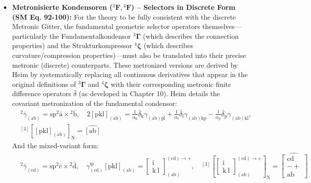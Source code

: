 \documentclass[12pt]{article}
\newcommand{\fundamentalkondensor}{{}^3\bm{\Gamma}}
\newcommand{\strukturkompressor}{{}^4\bm{\zeta}}
\newcommand{\metronisiertekondensor}[1]{{}^{#1}\mathbf{F}} %
\begin{document}
\begin{itemize}
    \item \textbf{Metronisierte Kondensoren (\( \metronisiertekondensor{3}, \metronisiertekondensor{4} \)) – Selectors in Discrete Form (SM Eq. 92-100):}
    For the theory to be fully consistent with the discrete Metronic Gitter, the fundamental geometric selector operators themselves—particularly the Fundamentalkondensor \( \fundamentalkondensor \) (which describes the connection properties) and the Strukturkompressor \( \strukturkompressor \) (which describes curvature/compression properties)—must also be translated into their precise metronic (discrete) counterparts. These metronized versions are derived by Heim by systematically replacing all continuous derivatives that appear in the original definitions of \( \fundamentalkondensor \) and \( \strukturkompressor \) with their corresponding metronic finite difference operators \( \bar{\delta} \) (as developed in Chapter 10). 
    Heim details the covariant metronization of the fundamental condensor:
    \begin{equation}
    \begin{aligned}
    & {}^2\bar{\gamma}_{(\mathrm{ab})} = \mathrm{sp}{}^2\bar{\mathrm{a}} \times {}^2\bar{\mathrm{b}}, \quad 2\left[\mathrm{pkl}\right]_{(\mathrm{ab})} = \frac{1}{\alpha_\mathrm{k}} \bar{\delta}_\mathrm{k} \gamma_{(\mathrm{ab})\mathrm{pl}} + \frac{1}{\alpha_\mathrm{l}} \bar{\delta}_\mathrm{l} \gamma_{(\mathrm{ab})\mathrm{kp}} - \frac{1}{\alpha_\mathrm{p}} \bar{\delta}_\mathrm{p} \gamma_{(\mathrm{ab})\mathrm{kl}}, \\
    & {}^{[3]}\left[ \left[ \mathrm{pkl} \right]_{(\mathrm{ab})} \right]_\mathrm{N} = \widehat{[\mathrm{ab}]}
    \end{aligned} \tag{92}
    \end{equation}
    And the mixed-variant form:
    \begin{equation}
    \begin{aligned}
    & {}^2\bar{\gamma}_{(\mathrm{cd})} = \mathrm{sp}{}^2\bar{\mathrm{c}} \times {}^2\bar{\mathrm{d}}, \quad \gamma^{\mathrm{ip}}_{(\mathrm{cd})} \left[ \mathrm{pkl} \right]_{(\mathrm{ab})} = \left[ \begin{matrix} \mathrm{i} \\ \mathrm{k\ l} \end{matrix} \right]^{(\mathrm{cd}) \rightarrow +}_{(\mathrm{ab})}, \quad {}^{[3]}\left[ \left[ \begin{matrix} \mathrm{i} \\ \mathrm{k\ l} \end{matrix} \right]^{(\mathrm{cd}) \rightarrow +}_{(\mathrm{ab})} \right]_\mathrm{N} = \widehat{\left[ \begin{matrix} \mathrm{cd} \\ - + \\ \mathrm{ab} \end{matrix} \right]}

\end{aligned}
\end{equation}
\end{itemize}
\end{document}
